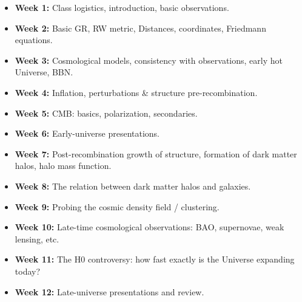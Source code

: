 \documentclass{article}
\begin{document}
\begin{itemize}

  \item {\bf Week 1:} Class logistics, introduction, basic observations.

  \item {\bf Week 2:} Basic GR, RW metric, Distances, coordinates, Friedmann 
    equations.

  \item {\bf Week 3:} Cosmological models, consistency with observations, 
  early hot Universe, BBN.

  \item {\bf Week 4:} Inflation, perturbations \& structure pre-recombination.

  \item {\bf Week 5:} CMB: basics, polarization, secondaries.

  \item {\bf Week 6:} Early-universe presentations.

  \item {\bf Week 7:} Post-recombination growth of structure, formation of dark 
  matter halos, halo mass function.

  \item {\bf Week 8:} The relation between dark matter halos and galaxies.

  \item {\bf Week 9:} Probing the cosmic density field / clustering.

  \item {\bf Week 10:} Late-time cosmological observations: BAO, supernovae, 
  weak lensing, etc.

  \item {\bf Week 11:} The H0 controversy: how fast exactly is the Universe 
  expanding today?

  \item {\bf Week 12:} Late-universe presentations and review.

\end{itemize}
\end{document}
